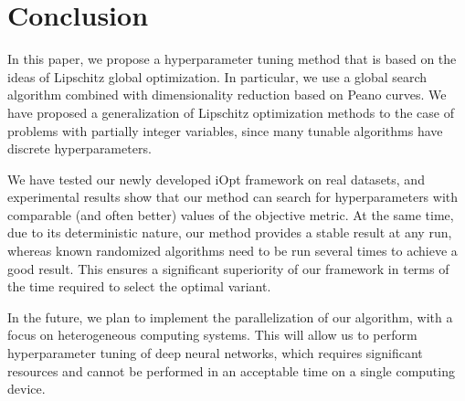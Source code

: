 \documentclass[iicol]{sn-jnl}
\theoremstyle{thmstyleone}%
\theoremstyle{thmstyletwo}%
\theoremstyle{thmstylethree}%
\begin{document}
\section{Conclusion}\label{sec13}

In this paper, we propose a hyperparameter tuning method that is based on the ideas of Lipschitz global optimization. In particular, we use a global search algorithm combined with dimensionality reduction based on Peano curves. We have proposed a generalization of Lipschitz optimization methods to the case of problems with partially integer variables, since many tunable algorithms have discrete hyperparameters.

We have tested our newly developed iOpt framework on real datasets, and experimental results show that our method can search for hyperparameters with comparable (and often better) values of the objective metric. At the same time, due to its deterministic nature, our method provides a stable result at any run, whereas known randomized algorithms need to be run several times to achieve a good result. This ensures a significant superiority of our framework in terms of the time required to select the optimal variant.

In the future, we plan to implement the parallelization of our algorithm, with a focus on heterogeneous computing systems. This will allow us to perform hyperparameter tuning of deep neural networks, which requires significant resources and cannot be performed in an acceptable time on a single computing device. 






\end{document}
